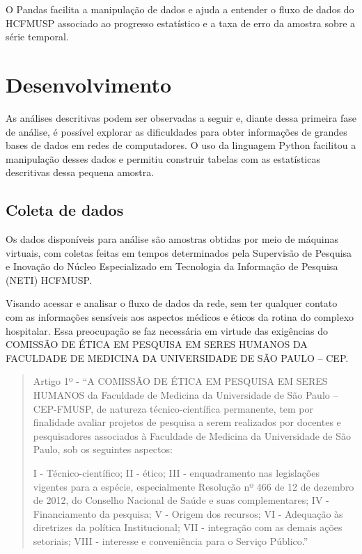 \documentclass[
	12pt,				%
	openright,			%
	twoside,			%
	a4paper,			%
	english,			%
	french,				%
	spanish,			%
	brazil				%
	]{abntex2}
\begin{document}
O Pandas facilita a manipulação de dados e ajuda a entender o fluxo de dados do HCFMUSP associado ao progresso estatístico e a taxa de erro da amostra sobre a série temporal.


\chapter{Desenvolvimento}

As análises descritivas podem ser observadas a seguir e, diante dessa primeira fase de análise, é possível explorar as dificuldades para obter informações de grandes bases de dados em redes de computadores. O uso da linguagem Python facilitou a manipulação desses dados e permitiu construir tabelas com as estatísticas descritivas dessa pequena amostra.

\section{Coleta de dados}

Os dados disponíveis para análise são amostras obtidas por meio de máquinas virtuais, com coletas feitas em tempos determinados pela Supervisão de Pesquisa e Inovação do Núcleo Especializado em Tecnologia da Informação de Pesquisa (NETI) HCFMUSP.

Visando acessar e analisar o fluxo de dados da rede, sem ter qualquer contato com as informações sensíveis aos aspectos médicos e éticos da rotina do complexo hospitalar. Essa preocupação se faz necessária em virtude das exigências do COMISSÃO DE ÉTICA EM PESQUISA EM SERES HUMANOS DA FACULDADE DE MEDICINA DA UNIVERSIDADE DE SÃO PAULO – CEP.

\begin{quote}
Artigo 1º - “A COMISSÃO DE ÉTICA EM PESQUISA EM SERES HUMANOS da Faculdade de Medicina da Universidade de São Paulo – CEP-FMUSP, de natureza técnico-científica permanente, tem por finalidade avaliar projetos de pesquisa a serem realizados por docentes e pesquisadores associados à Faculdade de Medicina da Universidade de São Paulo, sob os seguintes aspectos:


I - Técnico-científico;
II - ético;
III - enquadramento nas legislações vigentes para a espécie, especialmente Resolução nº 466 de 12 de dezembro de 2012, do Conselho
Nacional de Saúde e suas complementares;
IV - Financiamento da pesquisa;
V - Origem dos recursos;
VI - Adequação às diretrizes da política Institucional;
VII - integração com as demais ações setoriais;
VIII - interesse e conveniência para o Serviço Público.”
\end{quote}
\end{document}
